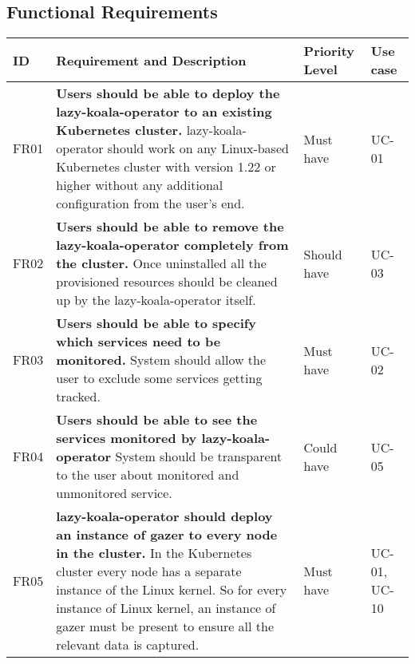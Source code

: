 
\newcommand{\functionalRequirement}[5]{
    #1 &
    \textbf{#2} \newline #3 &
    #4 &
    #5  \\ \hline
}

\subsection{Functional Requirements}

\begin{longtable}{|p{9mm}|p{109mm}|p{14mm}|p{13mm}|}
\hline
    \textbf{ID} &
    \textbf{Requirement and Description} &
    \textbf{Priority Level} &
    \textbf{Use case} \\ \hline


    \functionalRequirement
    {FR01}
    {Users should be able to deploy the \ac{lazy-koala-operator} to an existing Kubernetes cluster.}
    {\ac{lazy-koala-operator} should work on any Linux-based Kubernetes cluster with version 1.22 or higher without any additional configuration from the user's end.}
    {Must have}
    {UC-01}
    
    \functionalRequirement
    {FR02}
    {Users should be able to remove the \ac{lazy-koala-operator} completely from the cluster.}
    {Once uninstalled all the provisioned resources should be cleaned up by the \ac{lazy-koala-operator} itself. }
    {Should have}
    {UC-03}
    
        
    \functionalRequirement
    {FR03}
    {Users should be able to specify which services need to be monitored.}
    {System should allow the user to exclude some services getting tracked.}
    {Must have}
    {UC-02}
    
        
    \functionalRequirement
    {FR04}
    {Users should be able to see the services monitored by \ac{lazy-koala-operator}}
    {System should be transparent to the user about monitored and unmonitored service.}
    {Could have}
    {UC-05}
    
        
    \functionalRequirement
    {FR05}
    {\ac{lazy-koala-operator} should deploy an instance of \ac{gazer} to every node in the cluster.}
    {In the Kubernetes cluster every node has a separate instance of the Linux kernel. So for every instance of Linux kernel, an instance of \ac{gazer} must be present to ensure all the relevant data is captured.}
    {Must have}
    {UC-01, UC-10}
    

\end{longtable}
